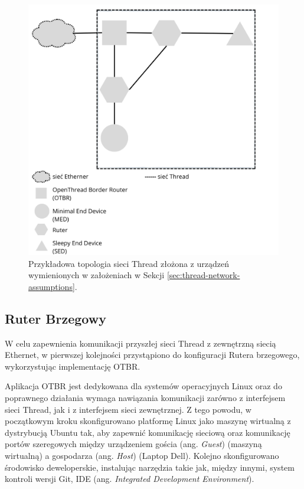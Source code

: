         \begin{figure}[H]
            \centering
            \includegraphics[width=0.8\linewidth]{graphics/thread-topology.png}
            \caption{Przykładowa topologia sieci Thread złożona z urządzeń wymienionych w założeniach w Sekcji \ref{sec:thread-network-assumptions}.}
            \label{fig:thread-topology}
        \end{figure}

    \subsection{Ruter Brzegowy}
    \label{subsec:otbr-implementation}

        W celu zapewnienia komunikacji przyszłej sieci Thread z zewnętrzną siecią Ethernet, w pierwszej kolejności przystąpiono do konfiguracji Rutera brzegowego, wykorzystując implementację OTBR. 
        
        Aplikacja OTBR jest dedykowana dla systemów operacyjnych Linux oraz do poprawnego działania wymaga nawiązania komunikacji zarówno z interfejsem sieci Thread, jak i z interfejsem sieci zewnętrznej. Z tego powodu, w początkowym kroku skonfigurowano platformę Linux jako maszynę wirtualną z dystrybucją Ubuntu tak, aby zapewnić komunikację sieciową oraz komunikację portów szeregowych między urządzeniem gościa (ang. \textit{Guest}) (maszyną wirtualną) a gospodarza (ang. \textit{Host}) (Laptop Dell). Kolejno skonfigurowano środowisko deweloperskie, instalując narzędzia takie jak, między innymi, system kontroli wersji Git, IDE (ang. \textit{Integrated Development Environment}). 

